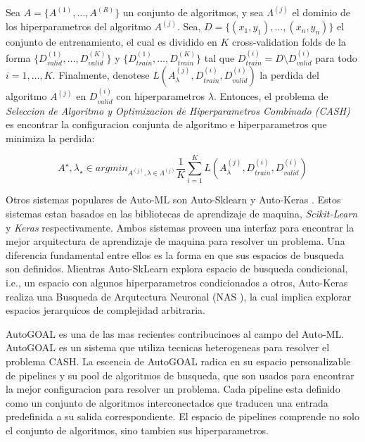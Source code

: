 \begin{definition}
\label{definition:cash}

    Sea $A = \{A^{(1)}, \dots, A^{(R)}\}$ un conjunto de algoritmos, y sea $\Lambda^{(j)}$ el dominio de los hiperparametros del algoritmo $A^{(j)}$. Sea, $D = \{(x_1, y_1), \dots, (x_n, y_n)\}$ el conjunto de entrenamiento, el cual es dividido en $K$ cross-validation folds de la forma $\{D_{valid}^{(1)}, \dots, D_{valid}^{(K)}\}$ y $\{D_{train}^{(1)}, \dots, D_{train}^{(K)}\}$ tal que $D_{train}^{(i)} = D \setminus D_{valid}^{(i)}$ para todo $i = 1, \dots, K$. Finalmente, denotese $L(A_{\lambda}^{(j)}, D_{train}^{(i)},D_{valid}^{(i)})$ la perdida del algoritmo $A^{(j)}$ en $D_{valid}^{(i)}$ con hiperparametros $\lambda$. Entonces, el problema de \textit{Seleccion de Algoritmo y Optimizacion de Hiperparametros Combinado (CASH)} es encontrar la configuracion conjunta de algoritmo e hiperparametros que minimiza la perdida:

    \begin{equation}
        A^{\star}, \lambda_{\star} \in argmin_{A^{(j)}, \lambda \in \Lambda^(j)} \frac{1}{K} \sum_{i=1}^K L(A_{\lambda}^{(j)}, D_{train}^{(i)},D_{valid}^{(i)})
    \end{equation}
\end{definition}

Otros sistemas populares de Auto-ML son Auto-Sklearn \cite{feurer2015efficient} y Auto-Keras \cite{autoKeras}. Estos sistemas estan basados en las bibliotecas de aprendizaje de maquina, \textit{Scikit-Learn} \cite{pedregosa2011scikit} y \textit{Keras} \cite{chollet2015keras} respectivamente. Ambos sistemas proveen una interfaz para encontrar la mejor arquitectura de aprendizaje de maquina para resolver un problema. Una diferencia fundamental entre ellos es la forma en que sus espacios de busqueda son definidos. Mientras Auto-SkLearn explora espacio de busqueda condicional, i.e., un espacio con algunos hiperparametros condicionados a otros, Auto-Keras realiza una Busqueda de Arqutectura Neuronal (NAS \cite{NAS}), la cual implica explorar espacios jerarquicos de complejidad arbitraria.

AutoGOAL \cite{autogoal, estevez2020general} es una de las mas recientes contribucinoes al campo del Auto-ML. AutoGOAL es un sistema que utiliza tecnicas heterogeneas para resolver el problema CASH. La escencia de AutoGOAL radica en su espacio personalizable de pipelines y su pool de algoritmos de busqueda, que son usados para encontrar la mejor configuracion para resolver un problema. Cada pipeline esta definido como un conjunto de algoritmos interconectados que traducen una entrada predefinida a su salida correspondiente. El espacio de pipelines comprende no solo el conjunto de algoritmos, sino tambien sus hiperparametros.


